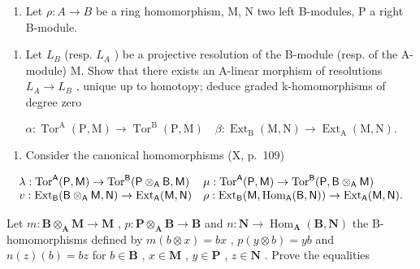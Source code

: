 
\begin{enumerate}
\def\labelenumi{\arabic{enumi})}
\tightlist
\item
  Let \(\rho: A \to B\) be a ring homomorphism, M, N two left B-modules, P a right B-module.
\end{enumerate}

\begin{enumerate}
\def\labelenumi{\alph{enumi})}
\tightlist
\item
  Let \(L_{B}\) (resp. \(L_{A}\) ) be a projective resolution of the B-module (resp. of the A-module) M. Show that there exists an A-linear morphism of resolutions \(L_{A} \rightarrow L_{B}\) , unique up to homotopy; deduce graded k-homomorphisms of degree zero
\end{enumerate}

\[
\alpha : \operatorname{Tor} ^ {\mathrm{A}} (\mathrm{P}, \mathrm{M}) \rightarrow \operatorname{Tor} ^ {\mathrm{B}} (\mathrm{P}, \mathrm{M}) \quad \beta : \operatorname{Ext} _ {\mathrm{B}} (\mathrm{M}, \mathrm{N}) \rightarrow \operatorname{Ext} _ {\mathrm{A}} (\mathrm{M}, \mathrm{N}).
\]

\begin{enumerate}
\def\labelenumi{\alph{enumi})}
\setcounter{enumi}{1}
\tightlist
\item
  Consider the canonical homomorphisms (X, p.~109)
\end{enumerate}

\[
\begin{array}{l l} \lambda : \operatorname{Tor} ^ {\mathsf {A}} (\mathsf {P}, \mathsf {M}) \to \operatorname{Tor} ^ {\mathsf {B}} (\mathsf {P} \otimes_ {\mathsf {A}} \mathsf {B}, \mathsf {M}) & \mu : \operatorname{Tor} ^ {\mathsf {A}} (\mathsf {P}, \mathsf {M}) \to \operatorname{Tor} ^ {\mathsf {B}} (\mathsf {P}, \mathsf {B} \otimes_ {\mathsf {A}} \mathsf {M}) \\ v: \operatorname{Ext} _ {\mathsf {B}} (\mathsf {B} \otimes_ {\mathsf {A}} \mathsf {M}, \mathsf {N}) \to \operatorname{Ext} _ {\mathsf {A}} (\mathsf {M}, \mathsf {N}) & \rho : \operatorname{Ext} _ {\mathsf {B}} (\mathsf {M}, \operatorname{Hom} _ {\mathsf {A}} (\mathsf {B}, \mathsf {N})) \to \operatorname{Ext} _ {\mathsf {A}} (\mathsf {M}, \mathsf {N}). \end{array}
\]

Let \(m: \mathbf{B} \otimes_{\mathbf{A}} \mathbf{M} \to \mathbf{M}\) , \(p: \mathbf{P} \otimes_{\mathbf{A}} \mathbf{B} \to \mathbf{B}\) and \(n: \mathbf{N} \to \operatorname{Hom}_{\mathbf{A}}(\mathbf{B}, \mathbf{N})\) the B-homomorphisms defined by \(m(b \otimes x) = bx\) , \(p(y \otimes b) = yb\) and \(n(z)(b) = bz\) for \(b \in \mathbf{B}\) , \(x \in \mathbf{M}\) , \(y \in \mathbf{P}\) , \(z \in \mathbf{N}\) . Prove the equalities

